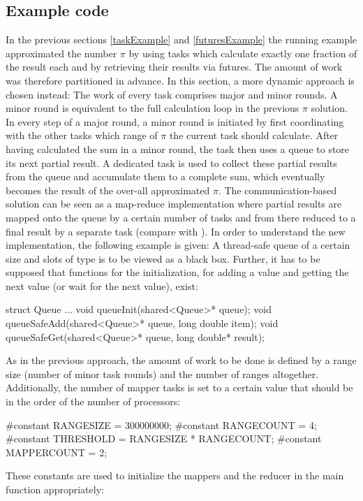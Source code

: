\subsection{Example code}
\label{sharedMemoryExample}
In the previous sections \ref{taskExample} and \ref{futuresExample} the running example approximated the number $\pi$ by using tasks which calculate exactly one fraction of the result each and by retrieving their results via futures. The amount of work was therefore partitioned in advance. In this section, a more dynamic approach is chosen instead: The work of every task comprises major and minor rounds. A minor round is equivalent to the full calculation loop in the previous $\pi$ solution. In every step of a major round, a minor round is initiated by first coordinating with the other tasks which range of $\pi$ the current task should calculate. After having calculated the sum in a minor round, the task then uses a queue to store its next partial result. A dedicated task is used to collect these partial results from the queue and accumulate them to a complete sum, which eventually becomes the result of the over-all approximated $\pi$. The communication-based solution can be seen as a map-reduce implementation where partial results are mapped onto the queue by a certain number of tasks and from there reduced to a final result by a separate task (compare with \cite{MapReduce}).
In order to understand the new implementation, the following example is given: A thread-safe queue of a certain size and slots of type  is to be viewed as a black box. Further, it has to be supposed that functions for the initialization, for adding a value and getting the next value (or wait for the next value), exist:
\begin{ccode}
struct Queue {...}
void queueInit(shared<Queue>* queue);
void queueSafeAdd(shared<Queue>* queue, long double item);
void queueSafeGet(shared<Queue>* queue, long double* result);
\end{ccode}
As in the previous approach, the amount of work to be done is defined by a range size (number of minor task rounds) and the number of ranges altogether. Additionally, the number of mapper tasks is set to a certain value that should be in the order of the number of processors:
\begin{ccode}
#constant RANGESIZE = 300000000; 
#constant RANGECOUNT = 4; 
#constant THRESHOLD = RANGESIZE * RANGECOUNT; 
#constant MAPPERCOUNT = 2;
\end{ccode}
These constants are used to initialize the mappers and the reducer in the main function appropriately:
